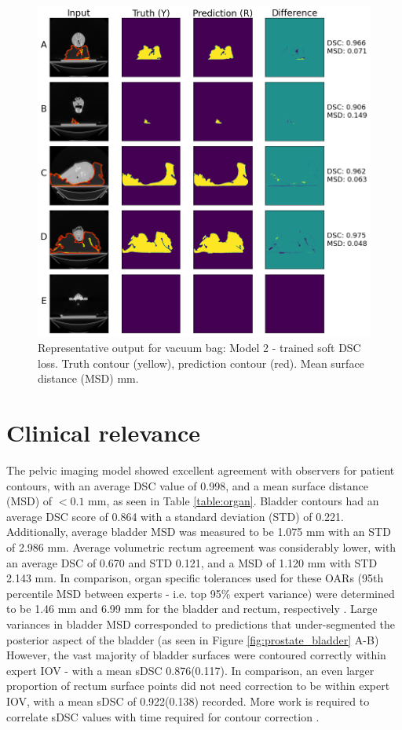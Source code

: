 \begin{figure}[H]
	\begin{center}
		\includegraphics[width=1.0\textwidth]{figures/vet_vacbag}
		\caption{Representative output for vacuum bag: Model 2 - trained soft DSC loss. Truth contour (yellow), prediction contour (red). Mean surface distance (MSD) mm.}
		\label{fig:vet_vacbag}
	\end{center}
\end{figure}

\section{Clinical relevance}
The pelvic imaging model showed excellent agreement with observers for patient contours, with an average DSC value of 0.998, and a mean surface distance (MSD) of $<0.1$ mm, as seen in Table \ref{table:organ}. Bladder contours had an average DSC score of 0.864 with a standard deviation (STD) of 0.221. Additionally, average bladder MSD was measured to be 1.075 mm with an STD of 2.986 mm. Average volumetric rectum agreement was considerably lower, with an average DSC of 0.670 and STD 0.121, and a MSD of 1.120 mm with STD 2.143 mm. In comparison, organ specific tolerances used for these OARs (95th percentile MSD between experts - i.e. top 95\% expert variance) were determined to be 1.46 mm and 6.99 mm for the bladder and rectum, respectively \cite{Roach_2019, Nikolov_2018}. Large variances in bladder MSD corresponded to predictions that under-segmented the posterior aspect of the bladder (as seen in Figure \ref{fig:prostate_bladder} A-B) However, the vast majority of bladder surfaces were contoured correctly within expert IOV - with a mean sDSC 0.876(0.117). In comparison, an even larger proportion of rectum surface points did not need correction to be within expert IOV, with a mean sDSC of 0.922(0.138) recorded. More work is required to correlate sDSC values with time required for contour correction \cite{Nikolov_2018, Vaassen_2020}.

